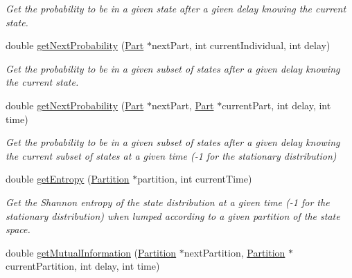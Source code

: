 \begin{DoxyCompactItemize}
\begin{DoxyCompactList}\small\item\em Get the probability to be in a given state after a given delay knowing the current state. \end{DoxyCompactList}\item 
\hypertarget{classMarkovProcess_a254635ef2e405073dd19aa14aa4ec365}{double \hyperlink{classMarkovProcess_a254635ef2e405073dd19aa14aa4ec365}{get\-Next\-Probability} (\hyperlink{classPart}{Part} $\ast$next\-Part, int current\-Individual, int delay)}\label{classMarkovProcess_a254635ef2e405073dd19aa14aa4ec365}

\begin{DoxyCompactList}\small\item\em Get the probability to be in a given subset of states after a given delay knowing the current state. \end{DoxyCompactList}\item 
\hypertarget{classMarkovProcess_a72033d86b846a06449a005f796ec14c1}{double \hyperlink{classMarkovProcess_a72033d86b846a06449a005f796ec14c1}{get\-Next\-Probability} (\hyperlink{classPart}{Part} $\ast$next\-Part, \hyperlink{classPart}{Part} $\ast$current\-Part, int delay, int time)}\label{classMarkovProcess_a72033d86b846a06449a005f796ec14c1}

\begin{DoxyCompactList}\small\item\em Get the probability to be in a given subset of states after a given delay knowing the current subset of states at a given time (-\/1 for the stationary distribution) \end{DoxyCompactList}\item 
\hypertarget{classMarkovProcess_ad1d295d33c8abc5bdabea3eeaf33b553}{double \hyperlink{classMarkovProcess_ad1d295d33c8abc5bdabea3eeaf33b553}{get\-Entropy} (\hyperlink{classPartition}{Partition} $\ast$partition, int current\-Time)}\label{classMarkovProcess_ad1d295d33c8abc5bdabea3eeaf33b553}

\begin{DoxyCompactList}\small\item\em Get the Shannon entropy of the state distribution at a given time (-\/1 for the stationary distribution) when lumped according to a given partition of the state space. \end{DoxyCompactList}\item 
\hypertarget{classMarkovProcess_a37aa6fee427f28a0d44dc369a2fd3b6a}{double \hyperlink{classMarkovProcess_a37aa6fee427f28a0d44dc369a2fd3b6a}{get\-Mutual\-Information} (\hyperlink{classPartition}{Partition} $\ast$next\-Partition, \hyperlink{classPartition}{Partition} $\ast$current\-Partition, int delay, int time)}\label{classMarkovProcess_a37aa6fee427f28a0d44dc369a2fd3b6a}


\end{DoxyCompactItemize}
